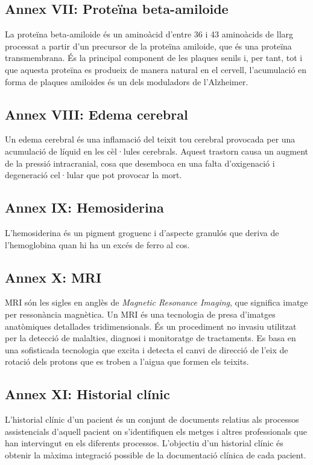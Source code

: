 \documentclass[a4paper,12pt]{article}
\begin{document}
\subsection*{Annex VII: Proteïna beta-amiloide}
La proteïna beta-amiloide és un aminoàcid d'entre 36 i 43 aminoàcids de llarg processat a partir d'un precursor de la proteïna amiloide, que és una proteïna transmembrana. És la principal component de les plaques senils i, per tant, tot i que aquesta proteïna es produeix de manera natural en el cervell, l'acumulació en forma de plaques amiloides és un dels moduladors de l'Alzheimer.
\subsection*{Annex VIII: Edema cerebral}
Un edema cerebral és una inflamació del teixit tou cerebral provocada per una acumulació de líquid en les cèl·lules cerebrals. Aquest trastorn causa un augment de la pressió intracranial, cosa que desemboca en una falta d'oxigenació i degeneració cel·lular que pot provocar la mort.
\subsection*{Annex IX: Hemosiderina}
L'hemosiderina és un pigment groguenc i d'aspecte granulós que deriva de l'hemoglobina quan hi ha un excés de ferro al cos.
\subsection*{Annex X: MRI}
MRI són les sigles en anglès de \textit{Magnetic Resonance Imaging}, que significa imatge per ressonància magnètica. Un MRI és una tecnologia de presa d'imatges anatòmiques detallades tridimensionals. És un procediment no invasiu utilitzat per la detecció de malalties, diagnosi i monitoratge de tractaments. Es basa en una sofisticada tecnologia que excita i detecta el canvi de direcció de l'eix de rotació dels protons que es troben a l'aigua que formen els teixits.
\subsection*{Annex XI: Historial clínic}
L'historial clínic d'un pacient és un conjunt de documents relatius als processos assistencials d'aquell pacient on s'identifiquen els metges i altres professionals que han intervingut en els diferents processos. L'objectiu d'un historial clínic és obtenir la màxima integració possible de la documentació clínica de cada pacient.
\end{document}
